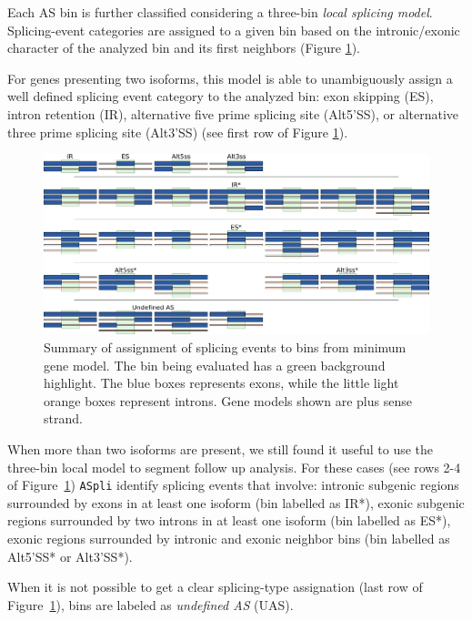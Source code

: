 \documentclass{article}
\begin{document}
Each AS bin is further classified considering a three-bin {\em local splicing model}. Splicing-event categories are assigned to a given bin based on the intronic/exonic character of the analyzed bin and its first neighbors (Figure \ref{fig:binAssignment}). 

For genes presenting two isoforms, this model is able to unambiguously assign a well defined splicing event category to the analyzed bin: exon skipping (ES),  intron retention (IR), alternative five prime splicing site (Alt5'SS), or alternative three prime splicing site (Alt3'SS) (see first row of Figure \ref{fig:binAssignment}).


\begin{figure}[ht!]
\centering
\includegraphics[width=1.3\textwidth]{images/event_assignment.pdf}
\caption{ Summary of assignment of splicing events to bins from minimum gene model. The bin being evaluated has a green background highlight. The blue boxes represents exons, while the little light orange boxes represent introns. Gene
models shown are plus sense strand. }
\label{fig:binAssignment}
\end{figure}

When more than two isoforms are present, we still found it useful to use the three-bin local model to segment follow up analysis. For these cases (see rows 2-4 of Figure~\ref{fig:binAssignment}) \texttt{ASpli} identify splicing events that involve: intronic subgenic regions surrounded by exons in at least one isoform (bin labelled as IR*), exonic subgenic regions surrounded by two introns in at least one isoform (bin labelled as ES*), exonic regions surrounded by intronic and exonic neighbor bins (bin labelled as Alt5'SS* or Alt3'SS*). 

When it is not possible to get a clear splicing-type assignation (last row of Figure~\ref{fig:binAssignment}), bins are labeled as {\em undefined AS} (UAS).  \\
\end{document}

